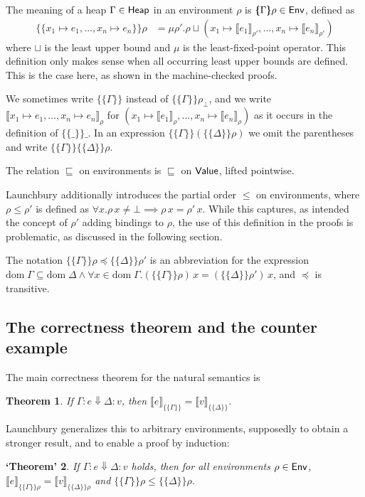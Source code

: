\documentclass{scrartcl}
\newtheorem{theorem}{Theorem}
\newtheorem{falsetheorem}[theorem]{‘Theorem’}
\theoremstyle{nonumberbreak}
\newcommand{\sHeap} {\text{\textsf{Heap}}}
\newcommand{\sValue}{\text{\textsf{Value}}}
\newcommand{\sEnv}  {\text{\textsf{Env}}}
\newcommand{\sred}[4]{#1 : #2 \Downarrow #3 : #4}
\newcommand{\dom}[1]{\text{dom}\;#1}
\newcommand{\xen}{x_1\mapsto e_1, \ldots, x_n\mapsto e_n}
\newcommand{\dsem}[2]{\llbracket #1 \rrbracket_{#2}}
\newcommand{\esem}[1]{\{\!\!\!\{#1\}\!\!\!\}}
\begin{document}
The meaning of a heap $\Gamma \in \sHeap$ in an environment $\rho$ is $\esem \Gamma \rho \in \sEnv$, defined as
\begin{align*}
\esem{ \xen}\rho 
&= \mu \rho'. \rho \sqcup (x_1 \mapsto \dsem{e_1}{\rho'}, \ldots, x_n \mapsto \dsem{e_n}{\rho'})
\end{align*}
where $\sqcup$ is the least upper bound and $\mu$ is the least-fixed-point operator. This definition only makes sense when all occurring least upper bounds are defined. This is the case here, as shown in the machine-checked proofs.

We sometimes write $\esem{\Gamma}$ instead of $\esem{\Gamma}{\rho_\bot}$, and we write $\dsem{\xen}\rho$ for $(x_1\mapsto \dsem{e_1}\rho,\ldots,x_n\mapsto \dsem{e_n}\rho)$ as it occurs in the definition of $\esem{\_}\_$. In an expression $\esem{\Gamma}(\esem{\Delta}\rho)$ we omit the parentheses and write $\esem{\Gamma}\esem{\Delta}\rho$.

The relation $\sqsubseteq$ on environments is $\sqsubseteq$ on $\sValue$, lifted pointwise.

Launchbury additionally introduces the partial order $\le$ on environments, where $\rho \le \rho'$ is defined as $\forall x. \rho\, x \ne \bot \implies \rho\,x =\rho'\,x$. While this captures, as intended the concept of $\rho'$ adding bindings to $\rho$, the use of this definition in the proofs is problematic, as discussed in the following section.

The notation $\esem{\Gamma}\rho \preceq \esem{\Delta}{\rho'}$ is an abbreviation for the expression $\dom\Gamma \subseteq \dom\Delta \wedge \forall x\in \dom\Gamma. (\esem{\Gamma}\rho)\,x = (\esem{\Delta}{\rho'})\,x$, and $\preceq$ is transitive.


\subsection{The correctness theorem and the counter example}
\label{counterexample}

The main correctness theorem for the natural semantics is
\begin{theorem}
If $\sred \Gamma e \Delta v$, then $\dsem{e}{\esem{\Gamma}} = \dsem{v}{\esem{\Delta}}$.
\label{thm:main}
\end{theorem}

Launchbury generalizes this to arbitrary environments, supposedly to obtain a stronger result, and to enable a proof by induction:

\begin{falsetheorem}
If $\sred \Gamma e \Delta v$ holds, then for all environments $\rho \in \sEnv$, $\dsem{e}{\esem{\Gamma}{\rho}} = \dsem{v}{\esem{\Delta}{\rho}}$ and $\esem\Gamma\rho \le \esem\Delta\rho$.%
\label{thm:false}
\end{falsetheorem}
\end{document}
